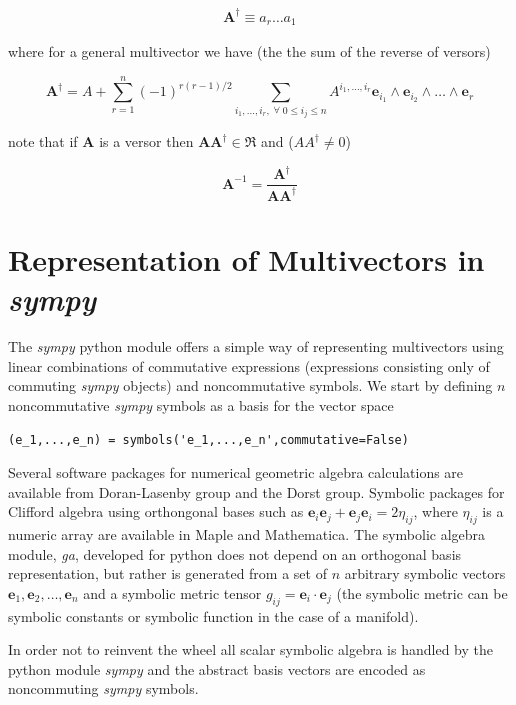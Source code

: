 \documentclass[12pt]{report}
\newcommand{\bm}[1]{\boldsymbol{#1}}
\newcommand{\bfrac}[2]{\displaystyle\frac{#1}{#2}}
\newcommand{\W}{\wedge}
\newcommand{\R}{\dagger}
\newcommand{\eb}{\bm{e}}
\begin{document}
   \begin{align}
      \bm{A}^{\R} \equiv a_{r}\dots a_{1}
   \end{align}

where for a general multivector we have (the the sum of the reverse of versors)

   \begin{equation}
      \bm{A}^{\R} = A + \sum_{r=1}^{n}(-1)^{r(r-1)/2}\sum_{i_{1},\dots,i_{r},\;\forall\; 0\le i_{j} \le n} A^{i_{1},\dots,i_{r}}\eb_{i_{1}}\W \eb_{i_{2}}\W\dots\W \eb_{r}
   \end{equation}

note that if $\bm{A}$ is a versor then $\bm{A}\bm{A}^{\R}\in\Re$ and ($AA^{\R} \ne 0$)

   \begin{equation}
      \bm{A}^{-1} = \bfrac{\bm{A}^{\R}}{\bm{AA}^{\R}}
   \end{equation}

\section{Representation of Multivectors in \emph{sympy}}

The \emph{sympy} python module offers a simple way of representing multivectors using linear
combinations of commutative expressions (expressions consisting only of commuting \emph{sympy} objects)
and noncommutative symbols. We start by defining $n$ noncommutative \emph{sympy} symbols as a basis for 
the vector space

\begin{lstlisting}[numbers=none]
   (e_1,...,e_n) = symbols('e_1,...,e_n',commutative=False)
\end{lstlisting}

Several software packages for numerical geometric algebra calculations are
available from Doran-Lasenby group and the Dorst group. Symbolic packages for
Clifford algebra using orthongonal bases such as
$\eb_{i}\eb_{j}+\eb_{j}\eb_{i} = 2\eta_{ij}$, where $\eta_{ij}$ is a numeric
array are available in Maple and Mathematica. The symbolic algebra module,
{\em ga}, developed for python does not depend on an orthogonal basis
representation, but rather is generated from a set of $n$ arbitrary
symbolic vectors $\eb_{1},\eb_{2},\dots,\eb_{n}$ and a symbolic metric
tensor $g_{ij} = \eb_{i}\cdot \eb_{j}$ (the symbolic metric can be symbolic constants
or symbolic function in the case of a manifold).

In order not to reinvent the wheel all scalar symbolic algebra is handled by the
python module \emph{sympy} and the abstract basis vectors are encoded as
noncommuting \emph{sympy} symbols.
\end{document}
